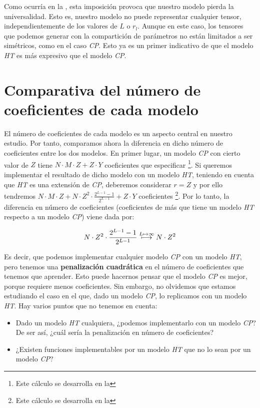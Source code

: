 Como ocurría en la , esta imposición provoca que nuestro modelo pierda la universalidad. Esto es, nuestro modelo no puede representar cualquier tensor, independientemente de los valores de $L$ o $r_l$. Aunque en este caso, los tensores que podemos generar con la compartición de parámetros no están limitados a ser simétricos, como en el caso \textit{CP}. Esto ya es un primer indicativo de que el modelo \textit{HT} es más expresivo que el modelo \textit{CP}.

\section{Comparativa del número de coeficientes de cada modelo}

El número de coeficientes de cada modelo es un aspecto central en nuestro estudio. Por tanto, comparamos ahora la diferencia en dicho número de coeficientes entre los dos modelos. En primer lugar, un modelo \textit{CP} con cierto valor de $Z$ tiene  $N \cdot M \cdot Z + Z \cdot Y$ coeficientes que especificar \footnote{Este cálculo se desarrolla en la }. Si queremos implementar el resultado de dicho modelo con un modelo \textit{HT}, teniendo en cuenta que \textit{HT} es una extensión de \textit{CP}, deberemos considerar $r = Z$ y por ello tendremos $N \cdot M \cdot Z + N \cdot Z^2 \cdot \frac{2^{L-1} - 1}{2^{L-1}} + Z \cdot Y$ coeficientes \footnote{Este cálculo se desarrolla en la }. Por lo tanto, la diferencia en número de coeficientes (coeficientes de más que tiene un modelo \textit{HT} respecto a un modelo \textit{CP}) viene dada por:

\begin{equation}
	N \cdot Z^2 \cdot \frac{2^{L-1} - 1}{2^{L-1}} \stackrel{L \mapsto \infty}{\longmapsto} N \cdot Z^2
\end{equation}

Es decir, que podemos implementar cualquier modelo \textit{CP} con un modelo \textit{HT}, pero tenemos una \textbf{penalización cuadrática} en el número de coeficientes que tenemos que aprender. Esto puede hacernos pensar que el modelo \textit{CP} es mejor, porque requiere menos coeficientes. Sin embargo, no olvidemos que estamos estudiando el caso en el que, dado un modelo \textit{CP}, lo replicamos con un modelo \textit{HT}. Hay varios puntos
que no tenemos en cuenta:

\begin{itemize}
	\item Dado un modelo \textit{HT} cualquiera, ¿podemos implementarlo con un modelo \textit{CP}? De ser así, ¿cuál sería la penalización en número de coeficientes?
	\item ¿Existen funciones implementables por un modelo \textit{HT} que no lo sean por un modelo \textit{CP}?
\end{itemize}

